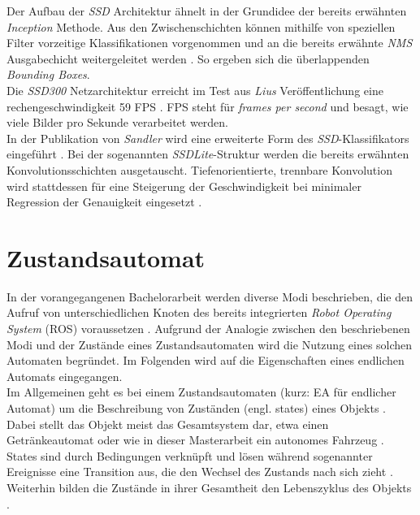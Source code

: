 		Der Aufbau der \textit{SSD} Architektur ähnelt in der Grundidee der bereits erwähnten \textit{Inception} Methode. Aus den Zwischenschichten können mithilfe von speziellen Filter vorzeitige Klassifikationen vorgenommen und an die bereits erwähnte \textit{NMS} Ausgabechicht weitergeleitet werden \cite{ssd}. So ergeben sich die überlappenden \textit{Bounding Boxes}.\\
		
		Die \textit{SSD300} Netzarchitektur erreicht im Test aus \textit{Lius} Veröffentlichung eine rechengeschwindigkeit 59 FPS \cite{ssd}. FPS steht für \textit{frames per second} und besagt, wie viele Bilder pro Sekunde verarbeitet werden.\\
		
		In der Publikation von \textit{Sandler} wird eine erweiterte Form des \textit{SSD}-Klassifikators eingeführt \cite{mobilenetv2}. Bei der sogenannten \textit{SSDLite}-Struktur werden die bereits erwähnten Konvolutionsschichten ausgetauscht. Tiefenorientierte, trennbare Konvolution wird stattdessen für eine Steigerung der Geschwindigkeit bei minimaler Regression der Genauigkeit eingesetzt \cite{mobilenetv2}.     		
		
		
		
		  			
	

			
	\section{Zustandsautomat}
	\label{sec: Zustandautomat}
	In der vorangegangenen Bachelorarbeit werden diverse Modi beschrieben, die den Aufruf von unterschiedlichen Knoten des bereits integrierten \textit{Robot Operating System} (ROS) voraussetzen \cite{Bachelorarbeit}. Aufgrund der Analogie zwischen den beschriebenen Modi und der Zustände eines Zustandsautomaten wird die Nutzung eines solchen Automaten begründet. Im Folgenden wird auf die Eigenschaften eines endlichen Automats eingegangen.\\
	
	Im Allgemeinen geht es bei einem Zustandsautomaten (kurz: EA für endlicher Automat) um die Beschreibung von Zuständen (engl. states) eines Objekts \cite{uml}. Dabei stellt das Objekt meist das Gesamtsystem dar, etwa einen Getränkeautomat oder wie in dieser Masterarbeit ein autonomes Fahrzeug \cite{uml}.\\
	
	States sind durch Bedingungen verknüpft und lösen während sogenannter Ereignisse eine Transition aus, die den Wechsel des Zustands nach sich zieht \cite{uml}. Weiterhin bilden die Zustände in ihrer Gesamtheit den Lebenszyklus des Objekts \cite{uml}.\\
	
